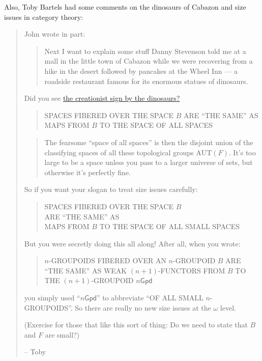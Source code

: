 \documentclass{article}
\begin{document}
Also, Toby Bartels had some comments on the dinosaurs of Cabazon and
size issues in category theory:

\begin{quote}
John wrote in part:

\begin{quote}
Next I want to explain some stuff Danny Stevenson told me at a mall in
the little town of Cabazon while we were recovering from a hike in the
desert followed by pancakes at the Wheel Inn --- a roadside restaurant
famous for its enormous statues of dinosaurs.
\end{quote}

Did you see
\href{http://www.latimes.com/news/local/la-me-dinosaurs27aug27,0,3988775,full.story}{the
creationist sign by the dinosaurs?}

\begin{quote}
SPACES FIBERED OVER THE SPACE \(B\) ARE ``THE SAME'' AS MAPS FROM \(B\)
TO THE SPACE OF ALL SPACES
\end{quote}

\begin{quote}
The fearsome ``space of all spaces'' is then the disjoint union of the
classifying spaces of all these topological groups \(\mathrm{AUT}(F)\).
It's too large to be a space unless you pass to a larger universe of
sets, but otherwise it's perfectly fine.
\end{quote}

So if you want your slogan to treat size issues carefully:

\begin{quote}
SPACES FIBERED OVER THE SPACE \(B\)\\
ARE ``THE SAME'' AS\\
MAPS FROM \(B\) TO THE SPACE OF ALL SMALL SPACES
\end{quote}

But you were secretly doing this all along! After all, when you wrote:

\begin{quote}
\(n\)-GROUPOIDS FIBERED OVER AN \(n\)-GROUPOID \(B\) ARE ``THE SAME'' AS
WEAK \((n+1)\)-FUNCTORS FROM \(B\) TO THE \((n+1)\)-GROUPOID
\(n\mathsf{Gpd}\)
\end{quote}

you simply used ``\(n\mathsf{Gpd}\)'' to abbreviate ``OF ALL SMALL
\(n\)-GROUPOIDS''. So there are really no new size issues at the
\(\omega\) level.

(Exercise for those that like this sort of thing: Do we need to state
that \(B\) and \(F\) are small?)

-- Toby
\end{quote}
\end{document}
